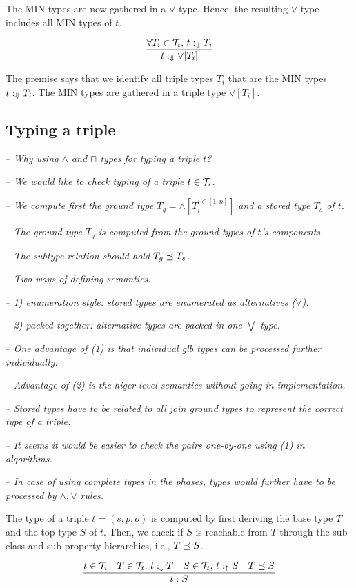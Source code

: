 \documentclass[runningheads]{llncs}
\newcommand{\darr}{\downarrow}
\newcommand{\uarr}{\uparrow}
\newcommand{\Darr}{\Downarrow}
\newcommand{\T}{{\cal T}}
\newcommand{\notes}[1]{\noindent\begin{small}-- \emph{#1}\hfill\break\end{small}}
\newcommand{\nnotes}[1]{\indent\begin{small}-- \emph{#1}\hfill\break\end{small}}
\begin{document}
The MIN types are now gathered in a $\lor$-type. Hence, the resulting
$\lor$-type includes all MIN types of $t$.

\begin{equation}
\dfrac{\forall\/T_i\in\T_t,\, t:_\Darr\/T_i}
      {t:_\Darr\lor[T_i]}
\end{equation}

The premise says that we identify all triple types $T_i$ that are the
MIN types $t:_\Darr\/T_i$. The MIN types are gathered in a triple type
$\lor[T_i]$.





\subsection{Typing a triple}

\notes{Why using $\land$ and $\sqcap$ types for typing a triple $t$?}
\nnotes{We would like to check typing of a triple $t\in\T_i$.}
\nnotes{We compute first the ground type $T_g=\land[T_i^{i\in[1,n]}]$ and a stored type $T_s$ of $t$.}
\nnotes{The ground type $T_g$ is computed from the ground types of $t$'s components.}
\nnotes{The subtype relation should hold $T_g\preceq\/T_s$.}

\notes{Two ways of defining semantics.}
\notes{1) enumeration style: stored types are enumerated as alternatives ($\lor$).}
\notes{2) packed together: alternative types are packed in one $\bigvee$ type.}
\notes{One advantage of (1) is that individual glb types can be processed further individually.}
\notes{Advantage of (2) is the higer-level semantics without going in implementation.}

\notes{Stored types have to be related to all join ground types to represent the correct type of a triple.}
\notes{It seems it would be easier to check the pairs one-by-one using (1) in algorithms.}
\notes{In case of using complete types in the phases, types would further have to be processed by $\land,\lor$ rules.}

The type of a triple $t=(s,p,o)$ is computed by first deriving the
base type $T$ and the top type $S$ of $t$. Then, we check if $S$ is
reachable from $T$ through the sub-class and sub-property hierarchies,
i.e., $T\preceq\/S$.

\begin{equation}
\label{rul:3-typing}
\dfrac{t\in\T_i\quad T\in\T_t,\, t:_{\darr}T\quad S\in\T_t,\, t:_\uarr\/S\quad T\preceq\/S}
      {t:S}
\end{equation}
\end{document}
